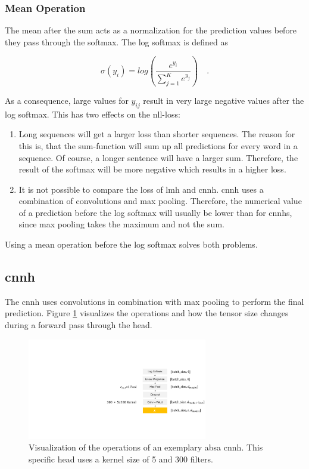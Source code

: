 \subsubsection*{Mean Operation}

The mean after the sum acts as a normalization for the prediction values before they pass through the softmax. The log softmax is defined as 

\begin{equation}
	\sigma(y_i)=log(\frac{e^{y_i}}{\sum_{j=1}^{K}e^{y_j}})\quad .
\end{equation}

As a consequence, large values for $y_{ij}$ result in very large negative values after the log softmax. This has two effects on the \gls{nll}-loss:

\begin{enumerate}
	\item Long sequences will get a larger loss than shorter sequences. The reason for this is, that the sum-function will sum up all predictions for every word in a sequence. Of course, a longer sentence will have a larger sum. Therefore, the result of the softmax will be more negative which results in a higher loss.
	\item It is not possible to compare the loss of \gls{lmh} and \gls{cnnh}. \gls{cnnh} uses  a combination of convolutions and max pooling. Therefore, the numerical value of a prediction before the log softmax will usually be lower than for \glspl{cnnh}, since max pooling takes the maximum and not the sum.
\end{enumerate}

Using a mean operation before the log softmax solves both problems.

\subsection{\acrfull{cnnh}}
The \acrfull{cnnh} uses convolutions in combination with max pooling to perform the final prediction. Figure \ref{fig:04_ch1} visualizes the operations and how the tensor size changes during a forward pass through the head. 
\medskip
\begin{figure}[htp]
	\centering
	\includegraphics[width=0.7\textwidth]{figures/04_method/04_ch}
	\caption{Visualization of the operations of an exemplary \gls{absa} \acrfull{cnnh}. This specific head uses a kernel size of 5 and 300 filters.}
	\label{fig:04_ch1}
\end{figure}

